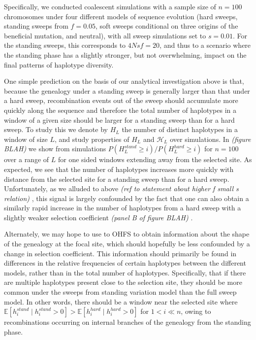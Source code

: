 \documentclass[a4paper,10pt]{article}
\newcommand{\jb}[1]{{\it\color{blue} (#1)} }
\begin{document}
Specifically, we conducted coalescent simulations with a sample size of $n=100$ chromosomes under four different models of sequence evolution (hard sweeps, standing sweeps from $f=0.05$, soft sweeps conditional on three origins of the beneficial mutation, and neutral), with all sweep simulations set to $s=0.01$. For the standing sweeps, this corresponds to $4Nsf = 20$, and thus to a scenario where the standing phase has a slightly stronger, but not overwhelming, impact on the final patterns of haplotype diversity.

One simple prediction on the basis of our analytical investigation above is that, because the genealogy under a standing sweep is generally larger than that under a hard sweep, recombination events out of the sweep should accumulate more quickly along the sequence and therefore the total number of haplotypes in a window of a given size should be larger for a standing sweep than for a hard sweep. To study this we denote by $H_L$ the number of distinct haplotypes in a window of size $L$, and study properties of $H_L$ and $\mathcal{H}_L$ over simulations.  In \jb{figure BLAH} we show from simulations $P\left(H_L^{stand} \geq i \right)/P\left(H_L^{hard} \geq i \right)$ for $n = 100$ over a range of $L$ for one sided windows extending away from the selected site. As expected, we see that the number of haplotypes increases more quickly with distance from the selected site for a standing sweep than for a hard sweep. Unfortunately, as we alluded to above \jb{ref to statement about higher f small s relation}, this signal is largely confounded by the fact that one can also obtain a similarly rapid increase in the number of haplotypes from a hard sweep with a slightly weaker selection coefficient \jb{panel B of figure BLAH}.

Alternately, we may hope to use to OHFS to obtain information about the shape of the genealogy at the focal site, which should hopefully be less confounded by a change in selection coefficient. This information should primarily be found in differences in the relative frequencies of certain haplotypes between the different models, rather than in the total number of haplotypes. Specifically, that if there are multiple haplotypes present close to the selection site,  they should be more common under the sweeps from standing variation model than the full sweep model. In other words, there should be a window near the selected site where $\mathbb{E}[h_i^{stand} \mid h_i^{stand} > 0] > \mathbb{E}[h_i^{hard} \mid h_i^{hard} > 0]$ for $1 < i \ll n$, owing to recombinations occurring on internal branches of the genealogy from the standing phase. 
\end{document}

